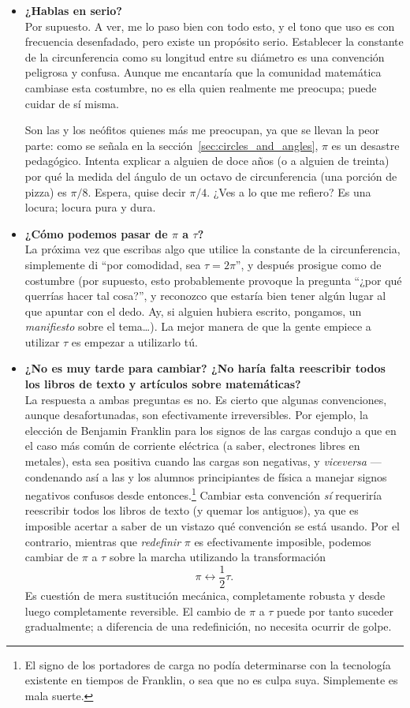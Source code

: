 \begin{itemize}

  \item \textbf{¿Hablas en serio?} \\ Por supuesto. A ver, me lo paso bien con todo esto, y el tono que uso es con frecuencia desenfadado, pero existe un propósito serio. Establecer la constante de la circunferencia como su longitud entre su diámetro es una convención peligrosa y confusa. Aunque me encantaría que la comunidad matemática cambiase esta costumbre, no es ella quien realmente me preocupa; puede cuidar de sí misma.

Son las y los neófitos quienes más me preocupan, ya que se llevan la peor parte: como se señala en la sección~\ref{sec:circles_and_angles}, $\pi$ es un desastre pedagógico. Intenta explicar a alguien de doce años (o a alguien de treinta) por qué la medida del ángulo de un octavo de circunferencia (una porción de pizza) es $\pi/8$. Espera, quise decir $\pi/4$. ¿Ves a lo que me refiero? Es una locura; locura pura y dura.

  \item \textbf{¿Cómo podemos pasar de $\pi$ a $\tau$?} \\ La próxima vez que escribas algo que utilice la constante de la circunferencia, simplemente di ``por comodidad, sea $\tau = 2\pi$'', y después prosigue como de costumbre (por supuesto, esto probablemente provoque la pregunta ``¿por qué querrías hacer tal cosa?'', y reconozco que estaría bien tener algún lugar al que apuntar con el dedo. Ay, si alguien hubiera escrito, pongamos, un \emph{manifiesto} sobre el tema\ldots). La mejor manera de que la gente empiece a utilizar $\tau$ es empezar a utilizarlo tú.

  \item \textbf{¿No es muy tarde para cambiar? ¿No haría falta reescribir todos los libros de texto y artículos sobre matemáticas?} \\ La respuesta a ambas preguntas es no. Es cierto que algunas convenciones, aunque desafortunadas, son efectivamente irreversibles. Por ejemplo, la elección de Benjamin Franklin para los signos de las cargas condujo a que en el caso más común de corriente eléctrica (a saber, electrones libres en metales), esta sea positiva cuando las cargas son negativas, y \emph{viceversa} ---condenando así a las y los alumnos principiantes de física a manejar signos negativos confusos desde entonces.\footnote{El signo de los portadores de carga no podía determinarse con la tecnología existente en tiempos de Franklin, o sea que no es culpa suya. Simplemente es mala suerte.} Cambiar esta convención \emph{sí} requeriría reescribir todos los libros de texto (y quemar los antiguos), ya que es imposible acertar a saber de un vistazo qué convención se está usando. Por el contrario, mientras que \emph{redefinir} $\pi$ es efectivamente imposible, podemos cambiar de $\pi$ a $\tau$ sobre la marcha utilizando la transformación \[ \pi \leftrightarrow \textstyle{\frac{1}{2}}\tau. \] Es cuestión de mera sustitución mecánica, completamente robusta y desde luego completamente reversible. El cambio de  $\pi$ a $\tau$ puede por tanto suceder gradualmente; a diferencia de una redefinición, no necesita ocurrir de golpe.


\end{itemize}
